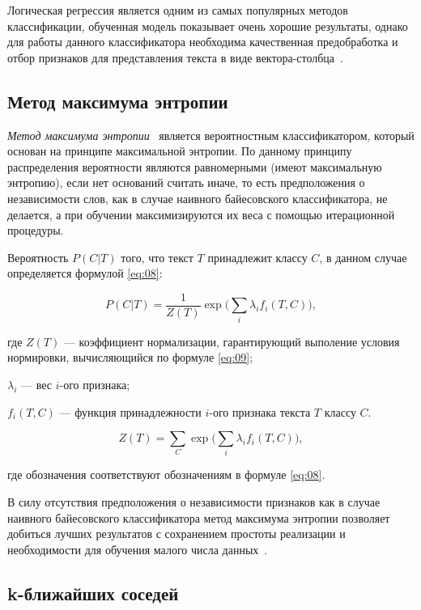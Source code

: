 Логическая регрессия является одним из самых популярных методов классификации,
обученная модель показывает очень хорошие результаты, однако для работы
данного классификатора необходима качественная предобработка и отбор
признаков для представления текста в виде вектора-столбца~\cite{article9}.

\subsection{Метод максимума энтропии}

\textit{Метод максимума энтропии}~\cite{article23} является вероятностным
классификатором, который основан на принципе максимальной энтропии. По данному
принципу распределения вероятности являются равномерными (имеют максимальную
энтропию), если нет оснований считать иначе, то есть предположения о
независимости слов, как в случае наивного байесовского классификатора, не
делается, а при обучении максимизируются их веса с помощью итерационной
процедуры.

Вероятность $P(C|T)$ того, что текст $T$ принадлежит классу $C$, в данном случае
определяется формулой \ref{eq:08}:

\begin{equation}\label{eq:08}
    P(C|T) = \frac{1}{Z(T)}\exp\Big(\sum_i \lambda_i f_i(T, C)\Big),
\end{equation}

где $Z(T)$ --- коэффициент нормализации, гарантирующий выполение условия
нормировки, вычисляющийся по формуле \ref{eq:09};

$\lambda_i$ --- вес $i$-ого признака;

$f_i(T, C)$ --- функция принадлежности $i$-ого признака текста $T$ классу
$C$.

\begin{equation}\label{eq:09}
    Z(T) = \sum_C\exp\Big(\sum_i \lambda_i f_i(T, C)\Big),
\end{equation}

где обозначения соответствуют обозначениям в формуле \ref{eq:08}.

В силу отсутствия предположения о независимости признаков как в
случае наивного байесовского классификатора метод максимума энтропии
позволяет добиться лучших результатов с сохранением простоты реализации и
необходимости для обучения малого числа данных~\cite{article9}.

\subsection{k-ближайших соседей}

